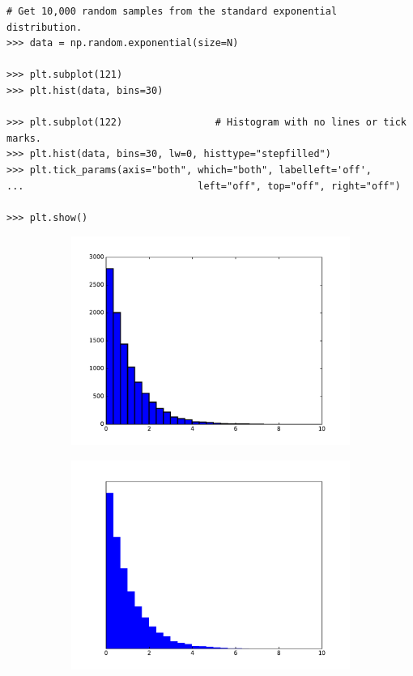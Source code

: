 \begin{lstlisting}
# Get 10,000 random samples from the standard exponential distribution.
>>> data = np.random.exponential(size=N)

>>> plt.subplot(121)
>>> plt.hist(data, bins=30)

>>> plt.subplot(122)                # Histogram with no lines or tick marks.
>>> plt.hist(data, bins=30, lw=0, histtype="stepfilled")
>>> plt.tick_params(axis="both", which="both", labelleft='off',
...                              left="off", top="off", right="off")

>>> plt.show()
\end{lstlisting}

\begin{figure}[H] %
\captionsetup[subfigure]{justification=centering}
\centering
\begin{subfigure}{.49\textwidth}
    \centering
    \includegraphics[width=\linewidth]{figures/hist_2_bad.pdf}
\end{subfigure}
%
\begin{subfigure}{.49\textwidth}
    \centering
    \includegraphics[width=\linewidth]{figures/hist_2_good.pdf}
\end{subfigure}
\end{figure}

